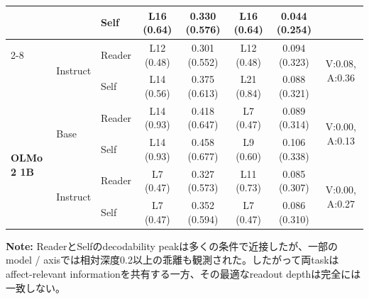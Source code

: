\begin{table}[htbp]
\begin{tabular}{lll cccc c}
                                 &  & Self   & L16 (0.64) & 0.330 (0.576) & L16 (0.64) & 0.044 (0.254) &  \\
\cmidrule(lr){2-8}
                                 & \multirow{2}{*}{Instruct} & Reader & L12 (0.48) & 0.301 (0.552) & L12 (0.48) & 0.094 (0.323) & \multirow{2}{*}{V:0.08, A:0.36} \\
                                 &  & Self   & L14 (0.56) & 0.375 (0.613) & L21 (0.84) & 0.088 (0.321) &  \\
\midrule
\multirow{4}{*}{\textbf{OLMo 2 1B}} & \multirow{2}{*}{Base} & Reader & L14 (0.93) & 0.418 (0.647) & L7 (0.47) & 0.089 (0.314) & \multirow{2}{*}{V:0.00, A:0.13} \\
                                 &  & Self   & L14 (0.93) & 0.458 (0.677) & L9 (0.60) & 0.106 (0.338) &  \\
\cmidrule(lr){2-8}
                                 & \multirow{2}{*}{Instruct} & Reader & L7 (0.47) & 0.327 (0.573) & L11 (0.73) & 0.085 (0.307) & \multirow{2}{*}{V:0.00, A:0.27} \\
                                 &  & Self   & L7 (0.47) & 0.352 (0.594) & L7 (0.47) & 0.086 (0.310) &  \\
\bottomrule
\end{tabular}
\vspace{1ex}
\begin{minipage}{\linewidth}
\footnotesize
\textbf{Note:} ReaderとSelfのdecodability peakは多くの条件で近接したが、一部のmodel / axisでは相対深度0.2以上の乖離も観測された。したがって両taskはaffect-relevant informationを共有する一方、その最適なreadout depthは完全には一致しない。
\end{minipage}
\end{table}

